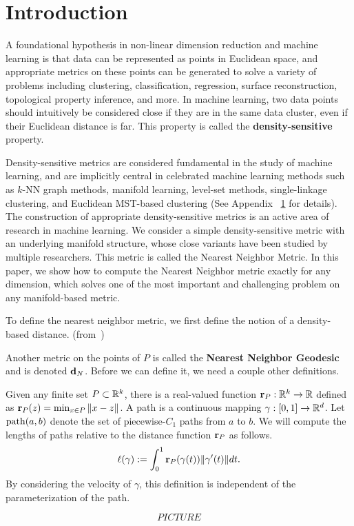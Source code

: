 \section{Introduction} A foundational hypothesis in non-linear dimension
reduction and machine learning is that data can be represented as points in
Euclidean space, and appropriate metrics on these points can be generated
to solve a variety of problems including clustering, classification,
regression, surface reconstruction, topological property inference, and
more. In machine learning, two data points should intuitively be considered
close if they are in the same data cluster, even if their Euclidean
distance is far. This property is called the \textbf{density-sensitive}
property.

Density-sensitive metrics are considered fundamental in the study of
machine learning, and are implicitly central in celebrated machine learning
methods such as $k$-NN graph methods, manifold learning, level-set methods,
single-linkage clustering, and Euclidean MST-based clustering (See Appendix
~\ref{} for details). The construction of appropriate density-sensitive
metrics is an active area of research in machine learning. We consider a
simple density-sensitive metric with an underlying manifold structure,
whose close variants have been studied by multiple researchers. This metric
is called the Nearest Neighbor Metric.  In this paper, we show how to
compute the Nearest Neighbor metric exactly for any dimension, which solves
one of the most important and challenging problem on any manifold-based
metric.

To define the nearest neighbor metric, we first define the notion of a
density-based distance. (from~\cite{})

\begin{definition}

Another metric on the points of $P$ is called the \textbf{Nearest Neighbor
Geodesic} and is denoted $\mathbf{d}_N$.  Before we can define it, we
need a couple other definitions.

Given any finite set $P\subset \mathbb{R}^k$, there is a real-valued function
$\mathbf{r}_P: \mathbb{R}^k\to \mathbb{R}$ defined as $\mathbf{r}_P(z) = \min_{x\in P}
\|x-z\|$.  A path is a continuous mapping $\gamma:[0,1]\to \mathbb{R}^d$.
Let $\mathrm{path}(a,b)$ denote the set of piecewise-$C_1$ paths from
$a$ to $b$.  We will compute the lengths of paths relative to the
distance function $\mathbf{r}_P$ as follows.  \[ \ell(\gamma) :=
\int_0^1 \mathbf{r}_P(\gamma(t))\|\gamma'(t)\|dt.  \] By considering
the velocity of $\gamma$, this definition is independent of the
parameterization of the path. 
\end{definition} $$PICTURE$$

